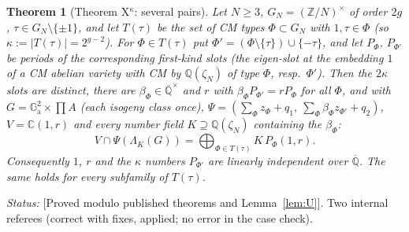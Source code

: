 \documentclass[11pt]{amsart}
\newtheorem{theorem}{Theorem}[section]
\theoremstyle{definition}
\newcommand{\Qb}{\overline{\mathbb{Q}}}
\newcommand{\C}{\mathbb{C}}
\newcommand{\Q}{\mathbb{Q}}
\newcommand{\Z}{\mathbb{Z}}
\newcommand{\Ga}{\mathbb{G}_{\mathrm a}}
\newcommand{\lab}[1]{\textup{[#1]}}
\newcommand{\LabC}{\lab{Proved modulo published theorems and Lemma~\ref{lem:U}}}
\newcommand{\Status}{\noindent\emph{Status:} }
\begin{document}
\begin{theorem}[Theorem X$^\kappa$: several pairs]\label{thm:Xk}
Let $N\ge3$, $G_N=(\Z/N)^\times$ of order $2g$, $\tau\in G_N\setminus\{\pm1\}$, and let $T(\tau)$ be the set of CM types
$\Phi\subset G_N$ with $1,\tau\in\Phi$ (so $\kappa:=|T(\tau)|=2^{g-2}$). For $\Phi\in T(\tau)$ put
$\Phi'=(\Phi\setminus\{\tau\})\cup\{-\tau\}$, and let $P_\Phi$, $P_{\Phi'}$ be periods of the corresponding first-kind slots
(the eigen-slot at the embedding $1$ of a CM abelian variety with CM by $\Q(\zeta_N)$ of type $\Phi$, resp.\ $\Phi'$). Then
the $2\kappa$ slots are distinct, there are $\beta_\Phi\in\Qb^\times$ and $r$ with $\beta_\Phi P_{\Phi'}=rP_\Phi$ for all
$\Phi$, and with $G=\Ga^2\times\prod A$ (each isogeny class once), $\Psi=(\sum_\Phi z_\Phi+q_1,\
\sum_\Phi\beta_\Phi z_{\Phi'}+q_2)$, $V=\C(1,r)$ and every number field $K\supseteq\Q(\zeta_N)$ containing the $\beta_\Phi$:
\[ V\cap\Psi(\Lambda_K(G))=\bigoplus_{\Phi\in T(\tau)}K\,P_\Phi(1,r). \]
Consequently $1$, $r$ and the $\kappa$ numbers $P_{\Phi'}$ are linearly independent over $\Qb$. The same holds for every
subfamily of $T(\tau)$.
\end{theorem}

\Status \LabC. Two internal referees (correct with fixes, applied; no error in the case check).
\end{document}
